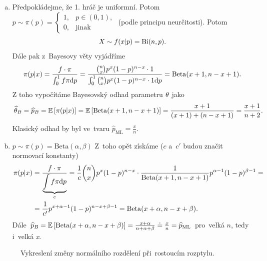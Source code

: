 \begin{example}
	\begin{enumerate}[a)]
		\item Předpokládejme, že 1. hráč je uniformní. Potom $p\sim\pi(p)=\begin{cases}
		1,& p\in (0,1),\\ 0,&\text{jinak}
		\end{cases}$ (podle principu neurčitosti). Potom
		$$ X\sim f(x|p)=\mathrm{Bi}(n,p).$$
		Dále pak z~Bayesovy věty vyjádříme
		$$ \pi(p|x)=\frac{f\cdot\pi}{\int_0^1 f\pi\mathrm{d} p}=\frac{\binom{n}{x}p^x(1-p)^{n-x}\cdot 1}{\int_0^1 \binom{n}{x}p^x(1-p)^{n-x}\cdot1 \mathrm{d} p}=\mathrm{Beta}(x+1,n-x+1).$$
		Z toho vypočítáme Bayesovský odhad parametru $\theta$ jako
		$$ \widehat{\theta}_B=\widehat{p}_B=\mathbb{E}\left[ \pi(p|x) \right]=\mathbb{E}\left[ \mathrm{Beta}(x+1,n-x+1) \right]=\frac{x+1}{(x+1)+(n-x+1)}=\frac{x+1}{n+2}.$$
		Klasický odhad by byl ve~tvaru $\widehat{p}_{\mathrm{ML}}=\frac{x}{n}$.
		\item $p\sim \pi(p)=\mathrm{Beta}(\alpha,\beta)$ Z~toho opět získáme ($c$ a~$c'$ budou značit normovací konstanty)
		\[
		\begin{split}
		\pi(p|x)&=\frac{f\cdot\pi}{\underbrace{\int f\pi\mathrm{d} p}_c}=\frac{1}{c}\binom{n}{x}p^x(1-p)^{n-x}\cdot \frac{1}{\mathrm{Beta}(x+1,n-x+1)}p^{\alpha-1}(1-p)^{\beta-1}=\\&=\frac{1}{c'}p^{x+\alpha-1}(1-p)^{n-x+\beta-1}=\mathrm{Beta}(x+\alpha,n-x+\beta).
		\end{split}
		\] 
		Dále
		$\widehat{p}_B=\mathbb{E}\left[ \mathrm{Beta}(x+\alpha,n-x+\beta) \right]=\frac{x+\alpha}{n+\alpha+\beta}\doteq\frac{x}{n} = \widehat{p}_\mathrm{ML}$ pro~velká $n$, tedy i~velká \textit{x}.
	\end{enumerate}
\end{example}

\begin{figure}[h]
	\centering
	\caption{Vykreslení změny normálního rozdělení při~rostoucím rozptylu.}
\end{figure}

